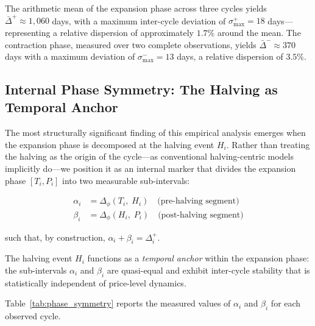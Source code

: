 The arithmetic mean of the expansion phase across three cycles yields
$\bar{\Delta}^{+} \approx 1{,}060$ days, with a maximum inter-cycle deviation
of $\sigma_{\max}^{+} = 18$ days---representing a relative dispersion of
approximately $1.7\%$ around the mean. The contraction phase, measured over
two complete observations, yields $\bar{\Delta}^{-} \approx 370$ days with a
maximum deviation of $\sigma_{\max}^{-} = 13$ days, a relative dispersion of
$3.5\%$.

\subsection{Internal Phase Symmetry: The Halving as Temporal Anchor}

The most structurally significant finding of this empirical analysis emerges
when the expansion phase is decomposed at the halving event $H_i$. Rather than
treating the halving as the origin of the cycle---as conventional
halving-centric models implicitly do---we position it as an internal marker
that divides the expansion phase $[T_i, P_i]$ into two measurable sub-intervals:

\begin{align}
  \alpha_i &= \Delta_{\phi}(T_i,\; H_i) \quad \text{(pre-halving segment)} \\
  \beta_i  &= \Delta_{\phi}(H_i,\; P_i) \quad \text{(post-halving segment)}
\end{align}

such that, by construction, $\alpha_i + \beta_i = \Delta^{+}_i$.

\begin{hypothesis}
  The halving event $H_i$ functions as a \textit{temporal anchor} within the
  expansion phase: the sub-intervals $\alpha_i$ and $\beta_i$ are quasi-equal
  and exhibit inter-cycle stability that is statistically independent of
  price-level dynamics.
\end{hypothesis}

Table~\ref{tab:phase_symmetry} reports the measured values of $\alpha_i$ and
$\beta_i$ for each observed cycle.

